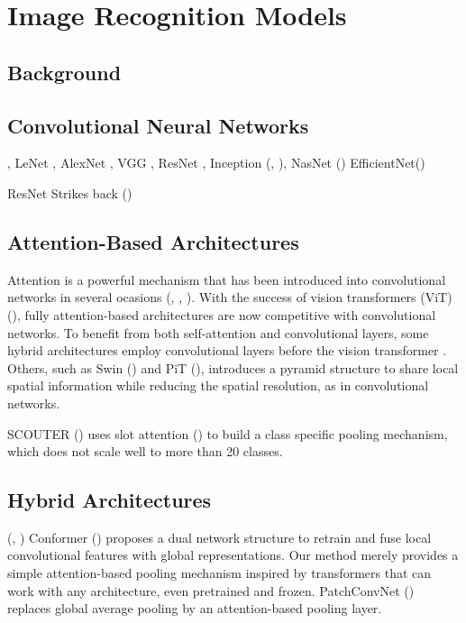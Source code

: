 \section{Image Recognition Models}
\label{rel:sec_imrecon}
\subsection{Background}
\label{rel:sub_background}

\subsection{Convolutional Neural Networks}
\label{rel:sub_cnn}
\cite{fukushima1975cognitron}, LeNet \cite{lecun1998gradient}, AlexNet \cite{krizhevsky2012imagenet}, VGG \cite{simonyan2015deep}, ResNet \cite{he2016deep}, 
Inception (\cite{szegedy2015going}, \cite{szegedy2016rethinking}), NasNet (\cite{zoph2018learning})
EfficientNet(\cite{tan2019efficientnet})

ResNet Strikes back (\cite{wightman2021resnet})

\subsection{Attention-Based Architectures}
\label{rel:sub_att}
Attention is a powerful mechanism that has been introduced into convolutional networks in several 
ocasions (\cite{bello2019attention}, \cite{ramachandran2019stand}, \cite{shen2020global}). 
With the success of vision transformers (ViT) (\cite{dosovitskiy2020image}), fully attention-based 
architectures are now competitive with convolutional networks. To benefit from both self-attention 
and convolutional layers, some hybrid architectures employ convolutional layers before the vision transformer 
. Others, such as Swin (\cite{liu2021swin}) and PiT 
(\cite{heo2021rethinking}), introduces a pyramid structure to share local spatial information 
while reducing the spatial resolution, as in convolutional networks. 

SCOUTER (\cite{li2021scouter}) uses slot attention (\cite{locatello2020object}) to build a class 
specific pooling mechanism, which does not scale well to more than 20 classes. 

\subsection{Hybrid Architectures}
\label{rel:sub_hybrid}
(\cite{graham2021levit}, \cite{xiao2021early})
Conformer (\cite{peng2021conformer}) proposes a dual network structure to retrain and fuse local 
convolutional features with global representations. Our method merely provides a simple 
attention-based pooling mechanism inspired by transformers that can work with any architecture, 
even pretrained and frozen. PatchConvNet (\cite{touvron2021augmenting}) replaces global average pooling by an 
attention-based pooling layer.
